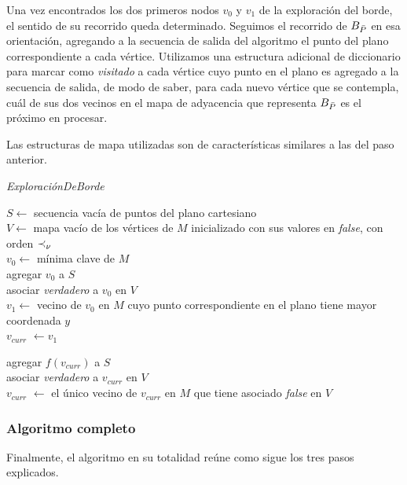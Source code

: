 Una vez encontrados los dos primeros nodos $v_0$ y $v_1$ de la exploración del borde, el sentido de su recorrido queda determinado. Seguimos el recorrido de $B_{\bar{P}}$ en esa orientación, agregando a la secuencia de salida del algoritmo el punto del plano correspondiente a cada vértice. Utilizamos una estructura adicional de diccionario para marcar como \textit{visitado} a cada vértice cuyo punto en el plano es agregado a la secuencia de salida, de modo de saber, para cada nuevo vértice que se contempla, cuál de sus dos vecinos en el mapa de adyacencia que representa $B_{\bar{P}}$ es el próximo en procesar.

Las estructuras de mapa utilizadas son de características similares a las del paso anterior.

\bigskip

\begin{algorithm}[H]
	\caption{\textit{ExploraciónDeBorde}}

	$S \gets$ secuencia vacía de puntos del plano cartesiano \\
	$V \gets$ mapa vacío de los vértices de $M$ inicializado con sus valores en \textit{false}, con orden $\prec_{\nu}$ \\
	$v_0 \gets$ mínima clave de $M$ \\
	agregar $v_0$ a $S$ \\
	asociar \textit{verdadero} a $v_0$ en $V$ \\
	$v_1 \gets$ vecino de $v_0$ en $M$ cuyo punto correspondiente en el plano tiene mayor coordenada $y$ \\
	$v_{\mathit{curr}}$ $\gets v_1$
	
	  {
		agregar $f(\mathit{v_{\mathit{curr}}})$ a $S$ \\
    		asociar \textit{verdadero} a $v_{\mathit{curr}}$ en $V$ \\
		$v_{\mathit{curr}}$ $\gets$ el único vecino de $v_{\mathit{curr}}$ en $M$ que tiene asociado \textit{false} en $V$ \\
	}

\end{algorithm}

\bigskip

\subsubsection{Algoritmo completo}

Finalmente, el algoritmo en su totalidad reúne como sigue los tres pasos explicados.


